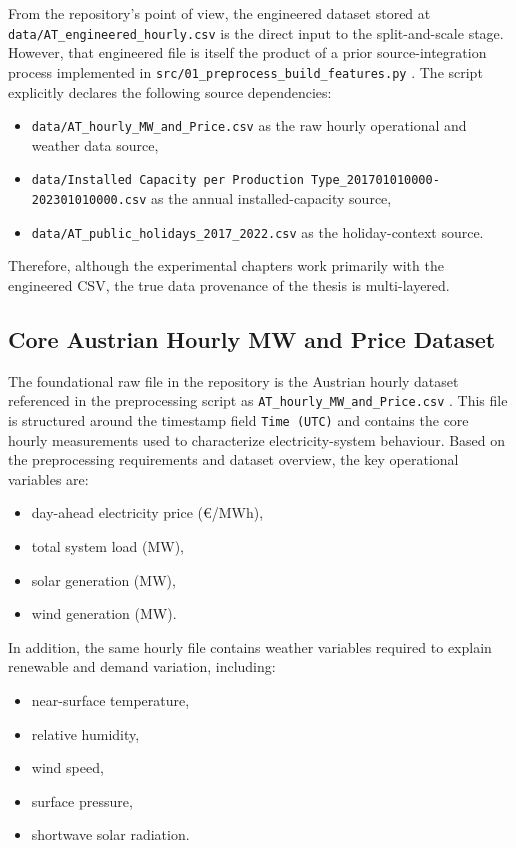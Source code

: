 From the repository’s point of view, the engineered dataset stored at \texttt{data/AT\_engineered\_hourly.csv} is the direct input to the split-and-scale stage. However, that engineered file is itself the product of a prior source-integration process implemented in \texttt{src/01\_preprocess\_build\_features.py} \cite{repo_thesis_grid_anomaly}. The script explicitly declares the following source dependencies:
\begin{itemize}
	\item \texttt{data/AT\_hourly\_MW\_and\_Price.csv} as the raw hourly operational and weather data source,
	\item \texttt{data/Installed Capacity per Production Type\_201701010000-202301010000.csv} as the annual installed-capacity source,
	\item \texttt{data/AT\_public\_holidays\_2017\_2022.csv} as the holiday-context source.
\end{itemize}
Therefore, although the experimental chapters work primarily with the engineered CSV, the true data provenance of the thesis is multi-layered.

\subsection{Core Austrian Hourly MW and Price Dataset}

The foundational raw file in the repository is the Austrian hourly dataset referenced in the preprocessing script as \texttt{AT\_hourly\_MW\_and\_Price.csv} \cite{repo_thesis_grid_anomaly}. This file is structured around the timestamp field \texttt{Time (UTC)} and contains the core hourly measurements used to characterize electricity-system behaviour. Based on the preprocessing requirements and dataset overview, the key operational variables are:
\begin{itemize}
	\item day-ahead electricity price (\euro{}/MWh),
	\item total system load (MW),
	\item solar generation (MW),
	\item wind generation (MW).
\end{itemize}
In addition, the same hourly file contains weather variables required to explain renewable and demand variation, including:
\begin{itemize}
	\item near-surface temperature,
	\item relative humidity,
	\item wind speed,
	\item surface pressure,
	\item shortwave solar radiation.
\end{itemize}

